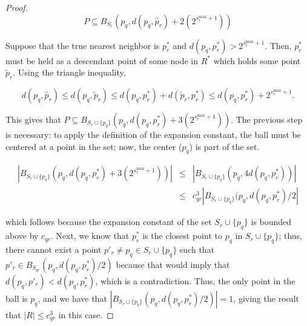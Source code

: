 \begin{proof}
\begin{equation}
P \subseteq B_{S_r}(p_q, d(p_q, \hat{p}_r) + 2(2^{s_r^{\max} + 1}))
\end{equation}



Suppose that the true nearest neighbor is $p_r^*$ and $d(p_q, p_r^*) >
2^{s_r^{\max} + 1}$.  Then, $p_r^*$ must be held as a descendant point of some
node in $R^*$ which holds some point $\tilde{p}_r$.  Using the triangle
inequality,

\begin{equation}
d(p_q, \hat{p}_r) \le d(p_q, \tilde{p}_r)
 \le d(p_q, p_r^*) + d(\tilde{p}_r, p_r^*)
 \le d(p_q, p_r^*) + 2^{s_r^{\max} + 1}.
\end{equation}

This gives that
$P \subseteq B_{S_r \cup \{ p_q \}}(p_q, d(p_q, p_r^*) + 3(2^{s_r^{\max} +
1}))$.
The previous step is necessary: to apply the definition of the expansion
constant, the ball must be centered at a point in the set; now, the center
($p_q$) is part of the set.

\begin{eqnarray}
| B_{S_r \cup \{ p_q \}}(p_q, d(p_q, p_r^*) + 3(2^{s_r^{\max} + 1})) | &\le& |
B_{S_r \cup \{ p_q \}}(p_q, 4 d(p_q, p_r^*)) | \\
 &\le& c_{qr}^3 | B_{S_r \cup \{ p_q \}}(p_q, d(p_q, p_r^*) / 2 |
\end{eqnarray}

\noindent which follows because the expansion constant of the set $S_r \cup \{
p_q \}$ is bounded above by $c_{qr}$.  Next, we know that $p_r^*$ is the closest
point to $p_q$ in $S_r \cup \{ p_q \}$; thus, there cannot exist a point $p'_r
\ne p_q \in S_r \cup \{ p_q \}$ such that
$p'_r \in B_{S_{qr}}(p_q, d(p_q, p_r^*) / 2)$
because that would imply that $d(p_q, p'_r) < d(p_q, p_r^*)$, which is
a contradiction.  Thus, the only point in the ball is $p_q$, and we have that $|
B_{S_r \cup \{ p_q \}}(p_q, d(p_q, p_r^*) / 2) | = 1$, giving the result that
$|R| \le c_{qr}^3$ in this case.


\end{proof}
